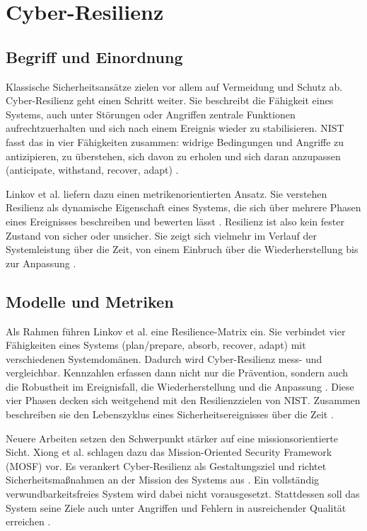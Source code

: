 \section{Cyber-Resilienz}
\label{sec:cyber-resilienz}

\subsection{Begriff und Einordnung}
\label{subsec:resilienz-begriff}

Klassische Sicherheitsansätze zielen vor allem auf Vermeidung und Schutz ab. Cyber-Resilienz geht
einen Schritt weiter. Sie beschreibt die Fähigkeit eines Systems, auch unter Störungen oder
Angriffen zentrale Funktionen aufrechtzuerhalten und sich nach einem Ereignis wieder zu
stabilisieren. NIST fasst das in vier Fähigkeiten zusammen: widrige Bedingungen und Angriffe zu
antizipieren, zu überstehen, sich davon zu erholen und sich daran anzupassen (anticipate,
withstand, recover, adapt) \cite{NISTSP800160v2}.

Linkov et al. liefern dazu einen metrikenorientierten Ansatz. Sie verstehen Resilienz als
dynamische Eigenschaft eines Systems, die sich über mehrere Phasen eines Ereignisses beschreiben
und bewerten lässt \cite[2--3]{Linkov2013ResilienceMetrics}. Resilienz ist also kein fester Zustand
von sicher oder unsicher. Sie zeigt sich vielmehr im Verlauf der Systemleistung über die Zeit, von
einem Einbruch über die Wiederherstellung bis zur Anpassung \cite[3--5]{Linkov2013ResilienceMetrics}.

\subsection{Modelle und Metriken}
\label{subsec:resilienz-modelle}

Als Rahmen führen Linkov et al. eine Resilience-Matrix ein. Sie verbindet vier Fähigkeiten eines
Systems (plan/prepare, absorb, recover, adapt) mit verschiedenen Systemdomänen. Dadurch wird
Cyber-Resilienz mess- und vergleichbar. Kennzahlen erfassen dann nicht nur die Prävention, sondern
auch die Robustheit im Ereignisfall, die Wiederherstellung und die Anpassung
\cite[3--4]{Linkov2013ResilienceMetrics}. Diese vier Phasen decken sich weitgehend mit den
Resilienzzielen von NIST. Zusammen beschreiben sie den Lebenszyklus eines Sicherheitsereignisses
über die Zeit \cite{NISTSP800160v2}.

Neuere Arbeiten setzen den Schwerpunkt stärker auf eine missionsorientierte Sicht. Xiong et al.
schlagen dazu das Mission-Oriented Security Framework (MOSF) vor. Es verankert Cyber-Resilienz als
Gestaltungsziel und richtet Sicherheitsmaßnahmen an der Mission des Systems aus
\cite{Xiong2023MissionOrientedResilience}. Ein vollständig verwundbarkeitsfreies System wird dabei
nicht vorausgesetzt. Stattdessen soll das System seine Ziele auch unter Angriffen und Fehlern in
ausreichender Qualität erreichen \cite{Xiong2023MissionOrientedResilience}.

